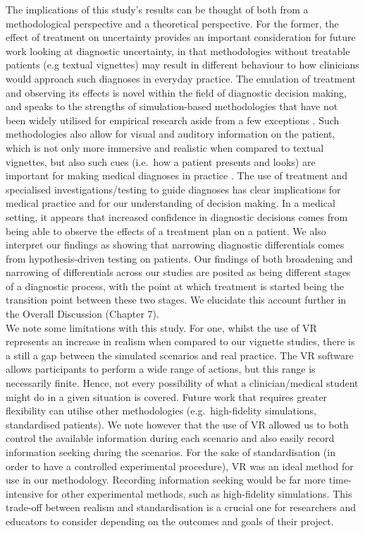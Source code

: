 \documentclass[a4paper, nobind]{templates/ociamthesis}
\begin{document}
The implications of this study's results can be thought of both from a methodological perspective and a theoretical perspective. For the former, the effect of treatment on uncertainty provides an important consideration for future work looking at diagnostic uncertainty, in that methodologies without treatable patients (e.g textual vignettes) may result in different behaviour to how clinicians would approach such diagnoses in everyday practice. The emulation of treatment and observing its effects is novel within the field of diagnostic decision making, and speaks to the strengths of simulation-based methodologies that have not been widely utilised for empirical research aside from a few exceptions \autocite{schmidt_simulation_2013,jans_examining_2023}. Such methodologies also allow for visual and auditory information on the patient, which is not only more immersive and realistic when compared to textual vignettes, but also such cues (i.e.~how a patient presents and looks) are important for making medical diagnoses in practice \autocite{sibbald_eyeballing_2017}. The use of treatment and specialised investigations/testing to guide diagnoses has clear implications for medical practice and for our understanding of decision making. In a medical setting, it appears that increased confidence in diagnostic decisions comes from being able to observe the effects of a treatment plan on a patient. We also interpret our findings as showing that narrowing diagnostic differentials comes from hypothesis-driven testing on patients. Our findings of both broadening and narrowing of differentials across our studies are posited as being different stages of a diagnostic process, with the point at which treatment is started being the transition point between these two stages. We elucidate this account further in the Overall Discussion (Chapter 7).\\

We note some limitations with this study. For one, whilst the use of VR represents an increase in realism when compared to our vignette studies, there is a still a gap between the simulated scenarios and real practice. The VR software allows participants to perform a wide range of actions, but this range is necessarily finite. Hence, not every possibility of what a clinician/medical student might do in a given situation is covered. Future work that requires greater flexibility can utilise other methodologies (e.g.~high-fidelity simulations, standardised patients). We note however that the use of VR allowed us to both control the available information during each scenario and also easily record information seeking during the scenarios. For the sake of standardisation (in order to have a controlled experimental procedure), VR was an ideal method for use in our methodology. Recording information seeking would be far more time-intensive for other experimental methods, such as high-fidelity simulations. This trade-off between realism and standardisation is a crucial one for researchers and educators to consider depending on the outcomes and goals of their project.
\end{document}
